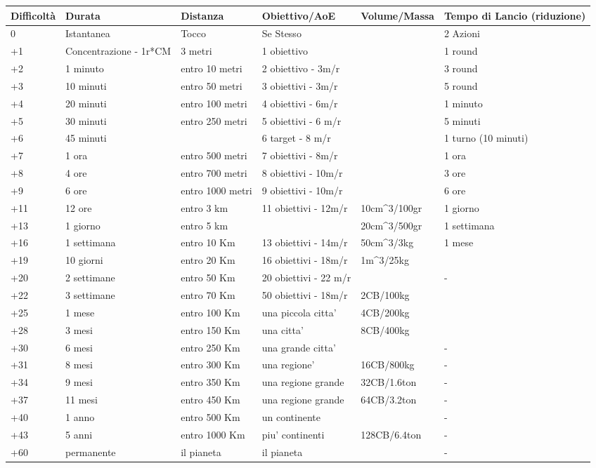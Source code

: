 \documentclass[a4paper,11pt,twoside,openany]{book}
\begin{document}
\begin{tabularx}{0.95\textwidth}{lXXXXX}
	\hline
	\textbf{Difficoltà} &\textbf{Durata} &\textbf{Distanza} &\textbf{Obiettivo/AoE} & \textbf{Volume/Massa} &\textbf{Tempo di Lancio (riduzione)} \\
	\hline
	0	& Istantanea		& Tocco	& Se Stesso&& 2 Azioni\\
\hline
	+1	& Concentrazione - 1r*CM	& 3 metri& 1 obiettivo&& 1 round\\
\hline
	+2	& 1 minuto	& entro 10 metri&2 obiettivo - 3m/r&& 3 round\\
\hline
	+3	&	10 minuti& entro 50 metri& 3 obiettivi - 3m/r&& 5 round\\
\hline
	+4	& 20 minuti	& entro 100 metri&4 obiettivi - 6m/r &&1 minuto\\
\hline
	+5&30 minuti&entro 250 metri&5 obiettivi - 6 m/r&&5 minuti\\
\hline
	+6&45 minuti&&6 target - 8 m/r&&1 turno (10 minuti)\\
	\hline
	+7&1 ora&entro 500 metri&7 obiettivi - 8m/r&&1 ora\\
	\hline
	+8&4 ore&entro 700 metri&8 obiettivi - 10m/r&&3 ore\\
	\hline
	+9&6 ore&entro 1000 metri&9 obiettivi - 10m/r&&6 ore\\
	\hline	
	+11&12 ore&entro 3 km&11 obiettivi - 12m/r& 10cm\^{}3/100gr&1 giorno\\
	\hline	
	+13&1 giorno&entro 5 km&&20cm\^{}3/500gr&1 settimana\\
	\hline	
	+16&1 settimana&entro 10 Km&13 obiettivi - 14m/r&50cm\^{}3/3kg&1 mese\\
	\hline	
	+19&10 giorni&entro 20 Km&16 obiettivi - 18m/r&1m\^{}3/25kg&\\
	\hline	
	+20&2 settimane&entro 50 Km&20 obiettivi - 22 m/r&&-\\
	\hline	
	+22&3 settimane&entro 70 Km&50 obiettivi - 18m/r&2CB/100kg&\\
	\hline	
	+25&1 mese&entro 100 Km&una piccola citta'&4CB/200kg&\\
	\hline	
	+28&3 mesi&entro 150 Km&una citta'&8CB/400kg&\\
	\hline	
	+30&6 mesi&entro 250 Km&una grande citta'&&-\\
	\hline	
	+31&8 mesi&entro 300 Km&una regione'&16CB/800kg&-\\
	\hline	
	+34&9 mesi&entro 350 Km&una regione grande&32CB/1.6ton&-\\
	\hline	
	+37&11 mesi&entro 450 Km&una regione grande&64CB/3.2ton&-\\
	\hline	
	+40&1 anno&entro 500 Km&un continente&&-\\
	\hline	
	+43&5 anni&entro 1000 Km&piu' continenti&128CB/6.4ton&-\\
	\hline	
	+60&permanente&il pianeta&il pianeta&&-\\
	\hline	
\end{tabularx}
\bigskip
\end{document}
